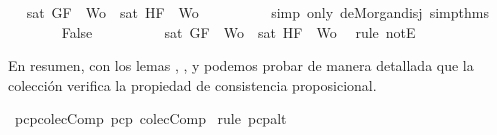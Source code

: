 \begin{isabellebody}
\ \isamarkupfalse%
\ {\isachardoublequoteopen}{\isasymnot}{\isacharparenleft}{\isasymnot}{\isacharparenleft}sat\ {\isacharparenleft}{\isacharbraceleft}G{\isacharcomma}F{\isacharbraceright}\ {\isasymunion}\ {\isacharquery}Wo{\isacharparenright}{\isacharparenright}\ {\isasymand}\ {\isasymnot}{\isacharparenleft}sat\ {\isacharparenleft}{\isacharbraceleft}H{\isacharcomma}F{\isacharbraceright}\ {\isasymunion}\ {\isacharquery}Wo{\isacharparenright}{\isacharparenright}{\isacharparenright}{\isachardoublequoteclose}\isanewline
\ \ \ \ \ \ \ \ \isamarkupfalse%
\ {\isacharparenleft}simp\ only{\isacharcolon}\ de{\isacharunderscore}Morgan{\isacharunderscore}disj\ simp{\isacharunderscore}thms{\isacharparenleft}{}{\isacharparenright}{\isacharparenright}\isanewline
\ \ \ \ \ \ \isamarkupfalse%
\ {\isachardoublequoteopen}False{\isachardoublequoteclose}\isanewline
\ \ \ \ \ \ \ \ \isamarkupfalse%
\ {\isacartoucheopen}{\isasymnot}{\isacharparenleft}sat\ {\isacharparenleft}{\isacharbraceleft}G{\isacharcomma}F{\isacharbraceright}\ {\isasymunion}\ {\isacharquery}Wo{\isacharparenright}{\isacharparenright}\ {\isasymand}\ {\isasymnot}{\isacharparenleft}sat\ {\isacharparenleft}{\isacharbraceleft}H{\isacharcomma}F{\isacharbraceright}\ {\isasymunion}\ {\isacharquery}Wo{\isacharparenright}{\isacharparenright}{\isacartoucheclose}\ \isamarkupfalse%
\ {\isacharparenleft}rule\ notE{\isacharparenright}\isanewline
\ \ \ \ \isamarkupfalse%
\isanewline
\ \ \isamarkupfalse%
\isanewline
{}\isamarkupfalse%
%
\endisatagproof
{\isafoldproof}%
%
\isadelimproof
%
\endisadelimproof
%
\begin{isamarkuptext}%
En resumen, con los lemas , ,  y
   podemos probar de manera detallada que la colección  verifica la propiedad 
  de consistencia proposicional.%
\end{isamarkuptext}\isamarkuptrue%
\isamarkupfalse%
\ pcp{\isacharunderscore}colecComp{\isacharcolon}\ {\isachardoublequoteopen}pcp\ colecComp{\isachardoublequoteclose}\isanewline
%
\isadelimproof
%
\endisadelimproof
%
\isatagproof
{}\isamarkupfalse%
\ {\isacharparenleft}rule\ pcp{\isacharunderscore}alt{}{\isacharparenright}\isanewline
\ \ \isamarkupfalse%

\end{isabellebody}
